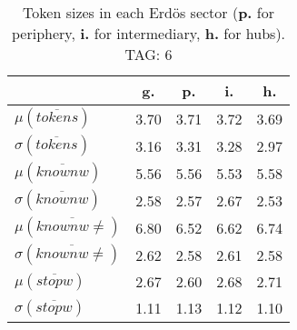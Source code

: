 \begin{table}[h!]
\begin{center}
\begin{tabular}{| l | c | c | c | c |}\hline
 & g. & p. & i. & h. \\\hline
$\mu(\overline{tokens})$ & 3.70  & 3.71  & 3.72  & 3.69 \\\hline
$\sigma(\overline{tokens})$ & 3.16  & 3.31  & 3.28  & 2.97 \\\hline
$\mu(\overline{knownw})$ & 5.56  & 5.56  & 5.53  & 5.58 \\\hline
$\sigma(\overline{knownw})$ & 2.58  & 2.57  & 2.67  & 2.53 \\\hline
$\mu(\overline{knownw \neq})$ & 6.80  & 6.52  & 6.62  & 6.74 \\\hline
$\sigma(\overline{knownw \neq})$ & 2.62  & 2.58  & 2.61  & 2.58 \\\hline
$\mu(\overline{stopw})$ & 2.67  & 2.60  & 2.68  & 2.71 \\\hline
$\sigma(\overline{stopw})$ & 1.11  & 1.13  & 1.12  & 1.10 \\\hline
\end{tabular}
\caption{Token sizes in each Erd\"os sector ({{\bf p.}} for periphery, {{\bf i.}} for intermediary, {{\bf h.}} for hubs). TAG: 6}
\end{center}
\end{table}